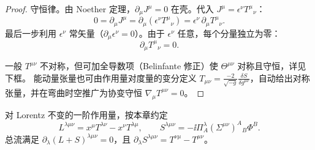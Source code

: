 \begin{proof}
守恒律。由 Noether 定理，$\partial_\mu J^\mu=0$ 在壳。代入 $J^\mu=\epsilon^\nu T^\mu{}_\nu$：
\begin{equation*}
0=\partial_\mu J^\mu=\partial_\mu(\epsilon^\nu T^\mu{}_\nu)=\epsilon^\nu\,\partial_\mu T^\mu{}_\nu.
\end{equation*}
最后一步利用 $\epsilon^\nu$ 常矢量（$\partial_\mu\epsilon^\nu=0$）。由于 $\epsilon^\nu$ 任意，每个分量独立为零：
\begin{equation}\label{eq:ms-poincare-T-conservation}
\boxed{\partial_\mu T^\mu{}_\nu=0.}
\end{equation}

一般 $T^{\mu\nu}$ 不对称，但可加全导数项（Belinfante 修正）使 $\Theta^{\mu\nu}$ 对称且守恒，详见下框。
能动量张量也可由作用量对度量的变分定义 $T_{\mu\nu}=\frac{-2}{\sqrt{-g}}\frac{\delta S}{\delta g^{\mu\nu}}$，自动给出对称张量，并在弯曲时空推广为协变守恒 $\nabla_\mu T^{\mu\nu}=0$。
\end{proof}

\begin{proposition}
对 Lorentz 不变的一阶作用量，按本章约定\[L^{\lambda\mu\nu}=x^\mu T^{\lambda\nu}-x^\nu T^{\lambda\mu},\qquad S^{\lambda\mu\nu}=-\ii\Pi_A^\lambda(\Sigma^{\mu\nu})^A{}_B\Phi^B.\]总流满足 $\partial_\lambda(L+S)^{\lambda\mu\nu}=0$，且 $\partial_\lambda S^{\lambda\mu\nu}=T^{\nu\mu}-T^{\mu\nu}$。
\end{proposition}

